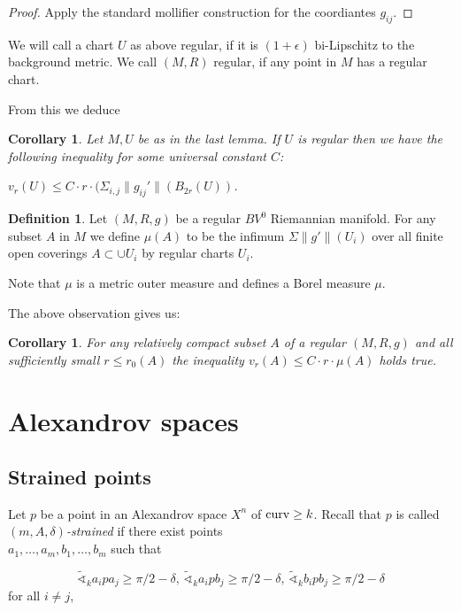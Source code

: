 \documentclass[12pt,leqno,intlimits]{amsart}
\numberwithin{equation}{section}
\newtheorem{cor}[thm]{Corollary}
\theoremstyle{definition}
\newtheorem{defn}[thm]{Definition}%
\theoremstyle{remark}
\newcommand{\curv}{\mathop{\rm curv}}
\begin{document}
\begin{proof}
Apply the standard mollifier construction for the coordiantes $g_{ij}$.
\end{proof}


  We will call a chart $U$ as above regular, if it is $(1+\epsilon)$ bi-Lipschitz to
  the background metric. We call $(M,R)$ regular, if any point in $M$ has a regular
  chart.

 From this we deduce
 \begin{cor}\label{cor-dc-vr}
 Let $M,U$ be  as in the last lemma. If $U$ is regular  then we have the following inequality for some
 universal constant $C$:

 $v_r (U) \leq C \cdot r \cdot (\Sigma _{i,j} \|g_{ij} '\| (B_{2r} (U))$.
\end{cor}


\begin{defn}
Let $(M,R,g)$ be a regular $BV^0$ Riemannian manifold. For any  subset
$A$ in $M$ we define $\mu (A)$ to be the infimum $\Sigma \|g '\| (U_i)$   over all finite open coverings $A\subset  \cup U_i$
by regular charts $U_i$.
\end{defn}

 Note that $\mu$ is a metric outer measure and defines a Borel measure $\mu$.


 The above observation gives us:
 \begin{cor}\label{cor-mu-dc}
 For any relatively compact subset $A$ of a regular $(M,R,g)$ and all sufficiently small $r \leq r_0 (A)$ the
 inequality $v_r (A) \leq C \cdot r \cdot \mu (A)$ holds true.
 \end{cor}





\section{Alexandrov spaces} \label{sec:Alex}


\subsection{Strained points}
Let $p$ be a point in an  Alexandrov space $X^n$ of $\curv\ge k$. Recall that $p$ is called \emph{$(m,A,\delta)$-strained} if there exist points\\ $a_1,\ldots, a_m, b_1,\ldots, b_m$ such that

\[
\tilde\sphericalangle_ka_ipa_j\ge \pi/2-\delta,\,\tilde\sphericalangle_ka_ipb_j\ge \pi/2-\delta,\, \tilde\sphericalangle_kb_ipb_j\ge \pi/2-\delta
\]
for all $i\ne j$,
\end{document}
